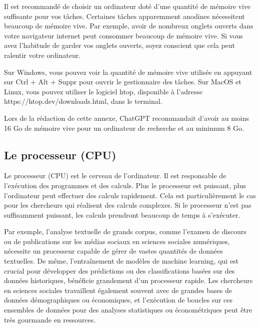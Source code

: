 \documentclass[
  letterpaper,
  DIV=11,
  numbers=noendperiod]{scrreprt}
\begin{document}
Il est recommandé de choisir un ordinateur doté d'une quantité de
mémoire vive suffisante pour vos tâches. Certaines tâches apparemment
anodines nécessitent beaucoup de mémoire vive. Par exemple, avoir de
nombreux onglets ouverts dans votre navigateur internet peut consommer
beaucoup de mémoire vive. Si vous avez l'habitude de garder vos onglets
ouverts, soyez conscient que cela peut ralentir votre ordinateur.

Sur Windows, vous pouvez voir la quantité de mémoire vive utilisée en
appuyant sur Ctrl + Alt + Suppr pour ouvrir le gestionnaire des tâches.
Sur MacOS et Linux, vous pouvez utiliser le logiciel htop, disponible à
l'adresse https://htop.dev/downloads.html, dans le terminal.

Lors de la rédaction de cette annexe, ChatGPT recommandait d'avoir au
moins 16 Go de mémoire vive pour un ordinateur de recherche et au
minimum 8 Go.

\subsection{Le processeur (CPU)}\label{le-processeur-cpu}

Le processeur (CPU) est le cerveau de l'ordinateur. Il est responsable
de l'exécution des programmes et des calculs. Plus le processeur est
puissant, plus l'ordinateur peut effectuer des calculs rapidement. Cela
est particulièrement le cas pour les chercheurs qui réalisent des
calculs complexes. Si le processeur n'est pas suffisamment puissant, les
calculs prendront beaucoup de temps à s'exécuter.

Par exemple, l'analyse textuelle de grands corpus, comme l'examen de
discours ou de publications sur les médias sociaux en sciences sociales
numériques, nécessite un processeur capable de gérer de vastes quantités
de données textuelles. De même, l'entraînement de modèles de machine
learning, qui est crucial pour développer des prédictions ou des
classifications basées sur des données historiques, bénéficie grandement
d'un processeur rapide. Les chercheurs en sciences sociales travaillent
également souvent avec de grandes bases de données démographiques ou
économiques, et l'exécution de boucles sur ces ensembles de données pour
des analyses statistiques ou économétriques peut être très gourmande en
ressources.
\end{document}
